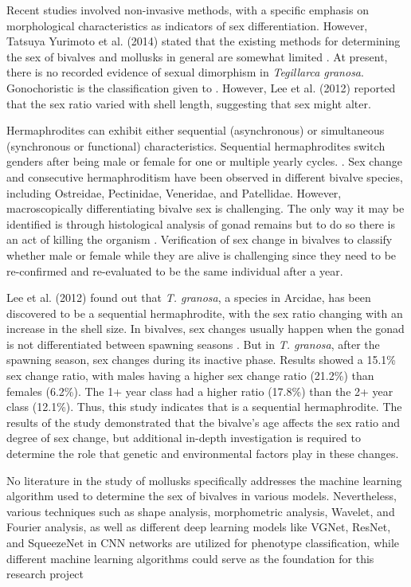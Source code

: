 Recent studies involved non-invasive methods, with a specific emphasis on morphological characteristics as indicators of sex differentiation. However,  Tatsuya Yurimoto et al. (2014) stated that the existing methods for determining the sex of bivalves and mollusks in general are somewhat limited \cite{afiati2007}. At present, there is no recorded evidence of sexual dimorphism in \textit{Tegillarca granosa}. Gonochoristic is the classification given to \Tegillarcagranosa \cite{lee1997}. However, Lee et al. (2012) reported that the sex ratio varied with shell length, suggesting that sex might alter. 

Hermaphrodites can exhibit either sequential (asynchronous) or simultaneous (synchronous or functional) characteristics. Sequential hermaphrodites switch genders after being male or female for one or multiple yearly cycles. \cite{heller1993, gosling2004, collin2013}. Sex change and consecutive hermaphroditism have been observed in different bivalve species, including Ostreidae, Pectinidae, Veneridae, and Patellidae. However, macroscopically differentiating bivalve sex is challenging. The only way it may be identified is through histological analysis of gonad remains but to do so there is an act of killing the organism \cite{coe1943, gosling2004}. Verification of sex change in bivalves to classify whether male or female while they are alive is challenging since they need to be re-confirmed and re-evaluated to be the same individual after a year.

Lee et al. (2012) found out that \textit{T. granosa}, a species in Arcidae, has been discovered to be a sequential hermaphrodite, with the sex ratio changing with an increase in the shell size. In bivalves, sex changes usually happen when the gonad is not differentiated between spawning seasons \cite{thompson1996}. But in \textit{T. granosa}, after the spawning season, sex changes during its inactive phase. Results showed a 15.1\% sex change ratio, with males having a higher sex change ratio (21.2\%) than females (6.2\%). The 1+ year class had a higher ratio (17.8\%) than the 2+ year class (12.1\%). Thus, this study indicates that \Tgranosa is a sequential hermaphrodite. The results of the study demonstrated that the bivalve's age affects the sex ratio and degree of sex change, but additional in-depth investigation is required to determine the role that genetic and environmental factors play in these changes.

No literature in the study of mollusks specifically addresses the machine learning algorithm used to determine the sex of \Tgranosa bivalves in various models. Nevertheless, various techniques such as shape analysis, morphometric analysis, Wavelet, and Fourier analysis, as well as different deep learning models like VGNet, ResNet, and SqueezeNet in CNN networks are utilized for phenotype classification, while different machine learning algorithms could serve as the foundation for this research project

